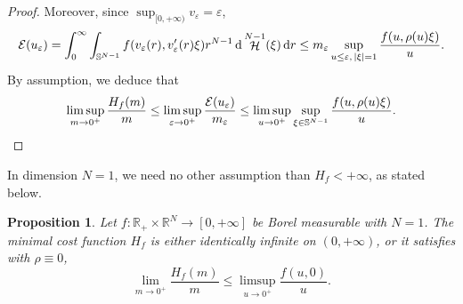 \documentclass[10pt]{amsart}
\theoremstyle{plain}
\newtheorem{proposition}[theorem]{Proposition}
\theoremstyle{definition}
\newcommand{\dd}{\mathop{}\mathopen{}\mathrm{d}}
\newcommand{\R}{\mathbb{R}}
\newcommand{\Sph}{\mathbb{S}}
\newcommand{\ener}{\mathcal{E}}
\newcommand{\eps}{\varepsilon}
\DeclarePairedDelimiter{\abs}{\lvert}{\rvert}
\DeclareMathOperator{\hdm}{\mathcal{H}}
\begin{document}
\begin{proof}
Moreover, since \(\sup_{[0,+\infty)} v_\eps=\eps\),
\begin{align*}
\ener(u_\eps)
=\int_0^\infty\int_{\Sph^{N-1}}f(v_\eps(r),v_\eps'(r)\xi) r^{N-1}\dd \hdm^{N-1}(\xi) \dd r
\leq
m_\eps\sup_{u\leq\eps,\, \abs{\xi}=1}\frac{f(u,\rho(u)\xi)}{u}.
\end{align*}
By assumption, we deduce that
\[
\limsup_{m\to 0^+}\frac{H_f(m)}{m}\leq\limsup_{\eps\to 0^+} \frac{\ener(u_\eps)}{m_\eps}\leq\limsup_{u\to 0^+}\sup_{\xi\in\Sph^{N-1} }\frac{f(u,\rho(u)\xi)}{u}.\qedhere
\]
\end{proof}

In dimension \(N=1\), we need no other assumption than \(H_f<+\infty\), as stated below.
\begin{proposition}\label{slopeUpperBound1D}
Let $f :\R_+\times\R^N\to[0,+\infty]$ be Borel measurable with $N=1$. The minimal cost function \(H_f\) is either identically infinite on \((0,+\infty)\), or it satisfies  with $\rho \equiv 0$, \ie
\[\lim_{m\to 0^+} \frac{H_f(m)}m \leq \limsup_{u\to 0^+} \frac{f(u,0)}u.\]
\end{proposition}
\end{document}
